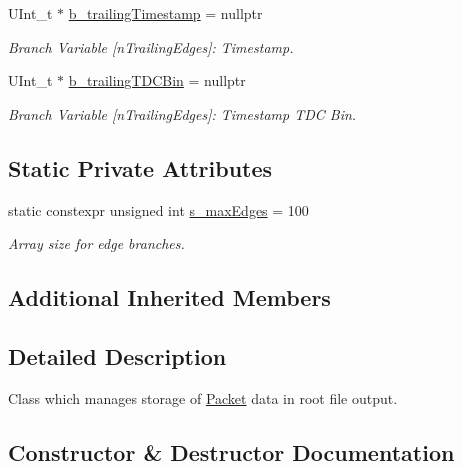 \begin{DoxyCompactItemize}
U\+Int\+\_\+t $\ast$ \hyperlink{class_packet_tree_manager_ac850c2a253026809b1118a572ede792c}{b\+\_\+trailing\+Timestamp} = nullptr
\begin{DoxyCompactList}\small\item\em Branch Variable \mbox{[}n\+Trailing\+Edges\mbox{]}\+: Timestamp. \end{DoxyCompactList}\item 
U\+Int\+\_\+t $\ast$ \hyperlink{class_packet_tree_manager_a80a9821f7a5d2af88a8daf4569f60e17}{b\+\_\+trailing\+T\+D\+C\+Bin} = nullptr
\begin{DoxyCompactList}\small\item\em Branch Variable \mbox{[}n\+Trailing\+Edges\mbox{]}\+: Timestamp T\+DC Bin. \end{DoxyCompactList}\end{DoxyCompactItemize}
\subsection*{Static Private Attributes}
\begin{DoxyCompactItemize}
\item 
static constexpr unsigned int \hyperlink{class_packet_tree_manager_a4ba06517ad1cb912ff70df1ff69231a5}{s\+\_\+max\+Edges} = 100
\begin{DoxyCompactList}\small\item\em Array size for edge branches. \end{DoxyCompactList}\end{DoxyCompactItemize}
\subsection*{Additional Inherited Members}


\subsection{Detailed Description}
Class which manages storage of \hyperlink{class_packet}{Packet} data in root file output. 

\subsection{Constructor \& Destructor Documentation}
\mbox{\label{class_packet_tree_manager_ab5393bcd3be4255232d9750cf85a4b13}} 
